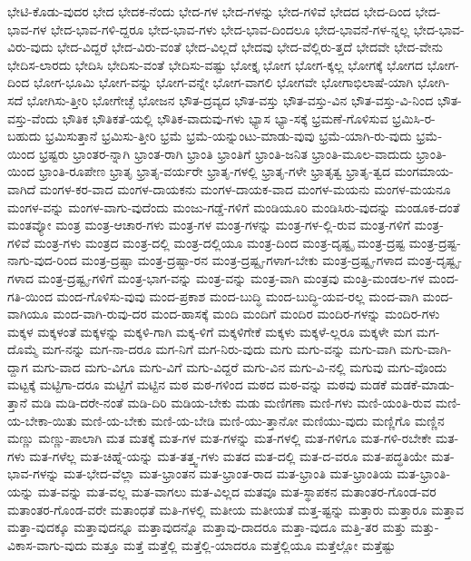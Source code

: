 {ಭೇಟಿ-ಕೊಡು-ವುದರ
ಭೇದ
ಭೇದಕ-ನೆಂದು
ಭೇದ-ಗಳ
ಭೇದ-ಗಳನ್ನು
ಭೇದ-ಗಳಿವೆ
ಭೇದದ
ಭೇದ-ದಿಂದ
ಭೇದ-ಭಾವ-ಗಳ
ಭೇದ-ಭಾವ-ಗಳಿ-ದ್ದರೂ
ಭೇದ-ಭಾವ-ಗಳು
ಭೇದ-ಭಾವ-ದಿಂದಲೂ
ಭೇದ-ಭಾವನೆ-ಗಳ-ನ್ನಲ್ಲ
ಭೇದ-ಭಾವ-ವಿರು-ವುದು
ಭೇದ-ವಿದ್ದರೆ
ಭೇದ-ವಿರು-ವಂತೆ
ಭೇದ-ವಿಲ್ಲದೆ
ಭೇದವು
ಭೇದ-ವೆಲ್ಲಿರು-ತ್ತದೆ
ಭೇದವೇ
ಭೇದ-ವೇನು
ಭೇದಿಸ-ಲಾರದು
ಭೇದಿಸಿ
ಭೇದಿಸು-ವಂತೆ
ಭೇದಿಸು-ವಷ್ಟು
ಭೋಕ್ತೃ
ಭೋಗ
ಭೋಗ-ಕ್ಕಲ್ಲ
ಭೋಗಕ್ಕೆ
ಭೋಗದ
ಭೋಗ-ದಿಂದ
ಭೋಗ-ಭೂಮಿ
ಭೋಗ-ವನ್ನು
ಭೋಗ-ವನ್ನೇ
ಭೋಗ-ವಾಗಲಿ
ಭೋಗವೇ
ಭೋಗಾಭಿಲಾಷೆ-ಯಾಗಿ
ಭೋಗಿ-ಸದೆ
ಭೋಗಿಸು-ತ್ತೀರಿ
ಭೋಗೇಚ್ಛೆ
ಭೋಜನ
ಭೌತ-ದ್ರವ್ಯದ
ಭೌತ-ವಸ್ತು
ಭೌತ-ವಸ್ತು-ವಿನ
ಭೌತ-ವಸ್ತು-ವಿ-ನಿಂದ
ಭೌತ-ವಸ್ತು-ವೆಂದು
ಭೌತಿಕ
ಭೌತಿಕತೆ-ಯಲ್ಲಿ
ಭೌತಿಕ-ವಾದುವು-ಗಳು
ಭ್ಯಾಸ
ಭ್ಯಾ-ಸಕ್ಕೆ
ಭ್ರಮಣೆ-ಗೊಳಿಸುವ
ಭ್ರಮಿಸಿ-ರ-ಬಹುದು
ಭ್ರಮಿಸುತ್ತಾನೆ
ಭ್ರಮಿಸು-ತ್ತೀರಿ
ಭ್ರಮೆ
ಭ್ರಮೆ-ಯನ್ನುಂಟು-ಮಾಡು-ವುವು
ಭ್ರಮೆ-ಯಾಗಿ-ರು-ವುದು
ಭ್ರಮೆ-ಯಿಂದ
ಭ್ರಷ್ಟರು
ಭ್ರಾಂತರ-ನ್ನಾಗಿ
ಭ್ರಾಂತ-ರಾಗಿ
ಭ್ರಾಂತಿ
ಭ್ರಾಂತಿಗೆ
ಭ್ರಾಂತಿ-ಜನಿತ
ಭ್ರಾಂತಿ-ಮೂಲ-ವಾದುದು
ಭ್ರಾಂತಿ-ಯಿಂದ
ಭ್ರಾಂತಿ-ರೂಪೇಣ
ಭ್ರಾತೃ
ಭ್ರಾತೃ-ವರ್ಯರೇ
ಭ್ರಾತೃ-ಗಳಲ್ಲಿ
ಭ್ರಾತೃ-ಗಳೇ
ಭ್ರಾತೃತ್ವ
ಭ್ರಾತೃ-ತ್ವದ
ಮಂಗಮಾಯ-ವಾಗಿದೆ
ಮಂಗಳ-ಕರ-ವಾದ
ಮಂಗಳ-ದಾಯಕನು
ಮಂಗಳ-ದಾಯಕ-ವಾದ
ಮಂಗಳ-ಮಯನು
ಮಂಗಳ-ಮಯನೂ
ಮಂಗಳ-ವನ್ನು
ಮಂಗಳ-ವಾಗು-ವುದೆಂದು
ಮಂಜು-ಗಡ್ಡೆ-ಗಳಿಗೆ
ಮಂಡಿಯೂರಿ
ಮಂಡಿಸಿರು-ವುದನ್ನು
ಮಂಡೂಕ-ದಂತೆ
ಮಂತವ್ಯೋ
ಮಂತ್ರ
ಮಂತ್ರ-ಆಚಾರ-ಗಳು
ಮಂತ್ರ-ಗಳ
ಮಂತ್ರ-ಗಳನ್ನು
ಮಂತ್ರ-ಗಳ-ಲ್ಲಿ-ರುವ
ಮಂತ್ರ-ಗಳಿಗೆ
ಮಂತ್ರ-ಗಳಿವೆ
ಮಂತ್ರ-ಗಳು
ಮಂತ್ರದ
ಮಂತ್ರ-ದಲ್ಲಿ
ಮಂತ್ರ-ದಲ್ಲಿಯೂ
ಮಂತ್ರ-ದಿಂದ
ಮಂತ್ರ-ದೃಷ್ಟೃ
ಮಂತ್ರ-ದ್ರಷ್ಟ
ಮಂತ್ರ-ದ್ರಷ್ಟ-ನಾಗು-ವುದ-ರಿಂದ
ಮಂತ್ರ-ದ್ರಷ್ಟಾ
ಮಂತ್ರ-ದ್ರಷ್ಟಾ-ರನ
ಮಂತ್ರ-ದ್ರಷ್ಟೃ-ಗಳಾಗ-ಬೇಕು
ಮಂತ್ರ-ದ್ರಷ್ಟೃ-ಗಳಾದ
ಮಂತ್ರ-ದೃಷ್ಟೃ-ಗಳಾದ
ಮಂತ್ರ-ದ್ರಷ್ಟೃ-ಗಳಿಗೆ
ಮಂತ್ರ-ಭಾಗ-ವನ್ನು
ಮಂತ್ರ-ವನ್ನು
ಮಂತ್ರ-ವಾಗಿ
ಮಂತ್ರವು
ಮಂತ್ರಿ-ಮಂಡಲ-ಗಳ
ಮಂದ-ಗತಿ-ಯಿಂದ
ಮಂದ-ಗೊಳಿಸು-ವುವು
ಮಂದ-ಪ್ರಕಾಶ
ಮಂದ-ಬುದ್ಧಿ
ಮಂದ-ಬುದ್ಧಿ-ಯವ-ರಲ್ಲ
ಮಂದ-ವಾಗಿ
ಮಂದ-ವಾಗಿಯೂ
ಮಂದ-ವಾಗಿ-ರುವು-ದರ
ಮಂದ-ಹಾಸಕ್ಕೆ
ಮಂದಿ
ಮಂದಿಗೆ
ಮಂದಿರ
ಮಂದಿರ-ಗಳನ್ನು
ಮಂದಿರ-ಗಳು
ಮಕ್ಕಳ
ಮಕ್ಕಳಂತೆ
ಮಕ್ಕಳನ್ನು
ಮಕ್ಕಳಿ-ಗಾಗಿ
ಮಕ್ಕ-ಳಿಗೆ
ಮಕ್ಕಳಿಗೇಕೆ
ಮಕ್ಕಳು
ಮಕ್ಕಳೆ-ಲ್ಲರೂ
ಮಕ್ಕಳೇ
ಮಗ
ಮಗ-ದೊಮ್ಮೆ
ಮಗ-ನನ್ನು
ಮಗ-ನಾ-ದರೂ
ಮಗ-ನಿಗೆ
ಮಗ-ನಿರು-ವುದು
ಮಗು
ಮಗು-ವನ್ನು
ಮಗು-ವಾಗಿ
ಮಗು-ವಾಗಿ-ದ್ದಾಗ
ಮಗು-ವಾದ
ಮಗು-ವಿಗೂ
ಮಗು-ವಿಗೆ
ಮಗು-ವಿದ್ದರೆ
ಮಗು-ವಿನ
ಮಗು-ವಿ-ನಲ್ಲಿ
ಮಗುವು
ಮಗು-ವೊಂದು
ಮಟ್ಟಕ್ಕೆ
ಮಟ್ಟಿಗಾ-ದರೂ
ಮಟ್ಟಿಗೆ
ಮಟ್ಟಿನ
ಮಠ
ಮಠ-ಗಳಿಂದ
ಮಠದ
ಮಠ-ವನ್ನು
ಮಠವು
ಮಡಕೆ
ಮಡಕೆ-ಮಾಡು-ತ್ತಾನೆ
ಮಡಿ
ಮಡಿ-ದರೇ-ನಂತೆ
ಮಡಿ-ದಿರಿ
ಮಡಿಯ-ಬೇಕು
ಮಡು
ಮಣಿಗಣಾ
ಮಣಿ-ಗಳು
ಮಣಿ-ಯಂತಿ-ರುವ
ಮಣಿ-ಯ-ಬೇಕಾ-ಯಿತು
ಮಣಿ-ಯ-ಬೇಕು
ಮಣಿ-ಯ-ಬೇಡಿ
ಮಣಿ-ಯು-ತ್ತಾನೋ
ಮಣಿಯು-ವುದು
ಮಣ್ಣಿಗೊ
ಮಣ್ಣಿನ
ಮಣ್ಣು
ಮಣ್ಣು-ಪಾಲಾಗಿ
ಮತ
ಮತಕ್ಕೆ
ಮತ-ಗಳ
ಮತ-ಗಳನ್ನು
ಮತ-ಗಳಲ್ಲಿ
ಮತ-ಗಳಿಗೂ
ಮತ-ಗಳಿ-ರಬೇಕೇ
ಮತ-ಗಳು
ಮತ-ಗಳೆಲ್ಲ
ಮತ-ಚಿಹ್ನೆ-ಯನ್ನು
ಮತ-ತತ್ತ್ವ-ಗಳು
ಮತದ
ಮತ-ದಲ್ಲಿ
ಮತ-ದ-ವರೂ
ಮತ-ಪದ್ಧತಿಯೇ
ಮತ-ಭಾವ-ಗಳನ್ನು
ಮತ-ಭೇದ-ವೆಲ್ಲಾ
ಮತ-ಭ್ರಾಂತನ
ಮತ-ಭ್ರಾಂತ-ರಾದ
ಮತ-ಭ್ರಾಂತಿ
ಮತ-ಭ್ರಾಂತಿಯ
ಮತ-ಭ್ರಾಂತಿ-ಯನ್ನು
ಮತ-ವನ್ನು
ಮತ-ವಲ್ಲ
ಮತ-ವಾಗಲು
ಮತ-ವಿಲ್ಲದ
ಮತವೂ
ಮತ-ಸ್ಥಾಪಕನ
ಮತಾಂತರ-ಗೊಂಡ-ವರ
ಮತಾಂತರ-ಗೊಂಡ-ವರೇ
ಮತಾಂಧತೆ
ಮತಿ-ಗಳಲ್ಲಿ
ಮತೀಯ
ಮತೀಯತೆ
ಮತ್ತ-ಷ್ಟನ್ನು
ಮತ್ತಾರು
ಮತ್ತಾರೂ
ಮತ್ತಾವ
ಮತ್ತಾ-ವುದಕ್ಕೂ
ಮತ್ತಾವುದನ್ನೂ
ಮತ್ತಾವುದನ್ನೊ
ಮತ್ತಾವು-ದಾದರೂ
ಮತ್ತಾ-ವುದೂ
ಮತ್ತಿ-ತರ
ಮತ್ತು
ಮತ್ತು-ವಿಕಾಸ-ವಾಗು-ವುದು
ಮತ್ತೂ
ಮತ್ತೆ
ಮತ್ತೆಲ್ಲಿ
ಮತ್ತೆಲ್ಲಿ-ಯಾದರೂ
ಮತ್ತೆಲ್ಲಿಯೂ
ಮತ್ತೆಲ್ಲೋ
ಮತ್ತೆಷ್ಟು
}
